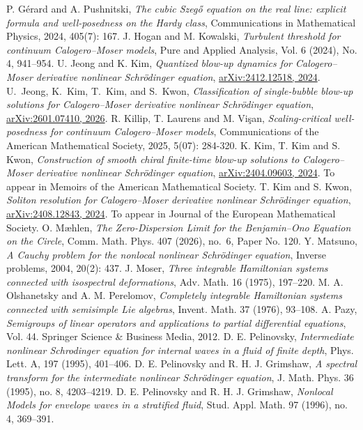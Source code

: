\documentclass[10pt]{article}
\numberwithin{equation}{section}
\numberwithin{theorem}{section}
\begin{document}
\begin{thebibliography}{}
 {\sc P. Gérard and A. Pushnitski}, {\em The cubic Szegő equation on the real line: explicit formula and well-posedness on the Hardy class}, Communications in Mathematical Physics, 2024, 405(7): 167.
 {\sc J. Hogan and M. Kowalski}, {\em Turbulent threshold for continuum Calogero--Moser models}, Pure and Applied Analysis, Vol. 6 (2024), No. 4, 941–954.
 {\sc U. Jeong and K. Kim}, {\em Quantized blow-up dynamics for Calogero--Moser derivative nonlinear Schrödinger equation}, \href{https://arxiv.org/abs/2412.12518}{arXiv:2412.12518, 2024}.
 {\sc U.~Jeong, K.~Kim, T.~Kim, and S.~Kwon},
{\em Classification of single-bubble blow-up solutions for Calogero--Moser derivative nonlinear Schr\"odinger equation}, \href{https://arxiv.org/abs/2601.07410}{arXiv:2601.07410, 2026}.
 {\sc R. Killip, T. Laurens and M. Vişan}, {\em Scaling-critical well-posedness for continuum Calogero--Moser models},  Communications of the American Mathematical Society, 2025, 5(07): 284-320.
 {\sc K. Kim, T. Kim and S. Kwon}, {\em Construction of smooth chiral finite-time blow-up solutions to Calogero--Moser derivative nonlinear Schrödinger equation}, \href{https://arxiv.org/abs/2404.09603}{arXiv:2404.09603, 2024}. To appear in Memoirs of the American Mathematical Society.
 {\sc T. Kim and S. Kwon}, {\em Soliton resolution for Calogero--Moser derivative nonlinear Schrödinger equation}, \href{https://arxiv.org/abs/2408.12843}{arXiv:2408.12843, 2024}. To appear in Journal of the European Mathematical Society.
{\sc O. M\ae hlen}, \emph{The Zero-Dispersion Limit for the Benjamin--Ono Equation on the Circle}, Comm. Math. Phys. 407 (2026), no.~6, Paper No. 120.
 {\sc Y. Matsuno}, {\em A Cauchy problem for the nonlocal nonlinear Schrödinger equation}, Inverse problems, 2004, 20(2): 437.
 {\sc J. Moser}, {\em Three integrable Hamiltonian systems connected with isospectral deformations}, Adv. Math. 16 (1975), 197–220.
 {\sc M. A. Olshanetsky and A. M. Perelomov}, {\em Completely integrable Hamiltonian systems connected with semisimple Lie algebras}, Invent. Math. 37 (1976), 93–108.
 {\sc A. Pazy}, {\em Semigroups of linear operators and applications to partial differential equations}, Vol. 44. Springer Science \& Business Media, 2012.
 {\sc D. E. Pelinovsky}, {\em Intermediate nonlinear Schrodinger equation for internal waves in a fluid of finite depth}, Phys. Lett. A, 197 (1995), 401–406.
 {\sc D. E. Pelinovsky and R. H. J. Grimshaw}, {\em A spectral transform for the intermediate nonlinear Schrödinger equation}, J. Math. Phys. 36 (1995), no. 8, 4203–4219.
 {\sc D. E. Pelinovsky and R. H. J. Grimshaw},  {\em Nonlocal Models for envelope waves in a stratified fluid}, Stud. Appl. Math. 97 (1996), no. 4, 369–391.
\end{thebibliography}
\end{document}
